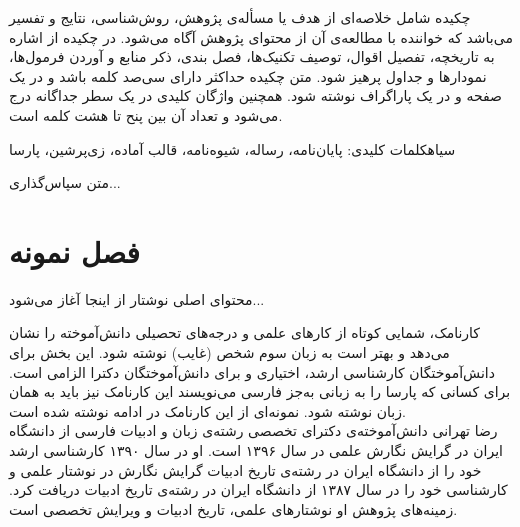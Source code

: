 \documentclass[%
12pt,%
twoside, %
openany, %
thesis, %
]{book}
\begin{document}
\pagestyle{empty}

\titlepageParsi
\newpage
%
\begin{ParsaAbstractParsi}
چکیده شامل خلاصه‌ای از هدف یا مسأله‌ی پژوهش، روش‌شناسی، نتایج و تفسیر می‌باشد که خواننده با مطالعه‌ی آن از محتوای پژوهش آگاه می‌شود. در چکیده از اشاره به تاریخچه، تفصیل اقوال، توصیف تکنیک‌ها، فصل بندی، ذکر منابع و آوردن فرمول‌ها، نمودارها و جداول پرهیز شود. متن چکیده حداکثر دارای سی‌صد کلمه باشد و در یک صفحه و در یک پاراگراف نوشته شود. همچنین واژگان کلیدی در یک سطر جداگانه درج می‌شود و تعداد آن بین پنح تا هشت کلمه است.  \bigskip

‌سیاه{کلمات کلیدی:} پایان‌نامه، رساله، شیوه‌نامه، قالب آماده، زی‌پرشین، پارسا
\end{ParsaAbstractParsi}
%

\ParsaCredit
\newpage

\ExaminationReportPa
\newpage

\ParsaCopyleft
\newpage


\begin{ParsaAcknowledge}
متن سپاس‌گذاری...
\end{ParsaAcknowledge}
\newpage


\chapter{فصل نمونه}
محتوای اصلی نوشتار از اینجا آغاز می‌شود...

\pagestyle{empty}

\begin{ParsaCV}
کارنامک، شمایی کوتاه از کارهای علمی و درجه‌های تحصیلی دانش‌آموخته را نشان می‌دهد و بهتر است به زبان سوم شخص (غایب) نوشته شود. این بخش برای دانش‌آموختگان کارشناسی ارشد، اختیاری و برای دانش‌آموختگان دکترا الزامی است. برای کسانی که پارسا را به زبانی به‌جز فارسی می‌نویسند این کارنامک نیز باید به همان زبان نوشته شود. نمونه‌ای از این کارنامک در ادامه نوشته شده است. \\

رضا تهرانی دانش‌آموخته‌ی دکترای تخصصی رشته‌ی زبان و ادبیات فارسی از دانشگاه ایران در گرایش نگارش علمی در سال ۱۳۹۶ است. او در سال ۱۳۹۰ کارشناسی ارشد خود را از دانشگاه ایران در رشته‌ی تاریخ ادبیات گرایش نگارش در نوشتار علمی و کارشناسی خود را در سال ۱۳۸۷ از دانشگاه ایران در رشته‌ی تاریخ ادبیات دریافت کرد. زمینه‌های پژوهش او نوشتارهای علمی، تاریخ ادبیات و ویرایش تخصصی است. \\
\end{ParsaCV}

\ExaminationReportLa
\newpage

\titlepageLatin
\end{document}
